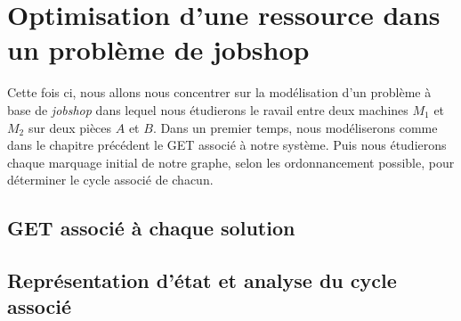 \chapter{Optimisation d'une ressource dans un problème de jobshop}
Cette fois ci, nous allons nous concentrer sur la modélisation d'un problème à base de \emph{jobshop} dans lequel nous étudierons le ravail entre deux machines $M_1$ et $M_2$ sur deux pièces $A$ et $B$. Dans un premier temps, nous modéliserons comme dans le chapitre précédent le GET associé à notre système. Puis nous étudierons chaque marquage initial de notre graphe, selon les ordonnancement possible, pour déterminer le cycle associé de chacun.

\section{GET associé à chaque solution}

\section{Représentation d'état et analyse du cycle associé}